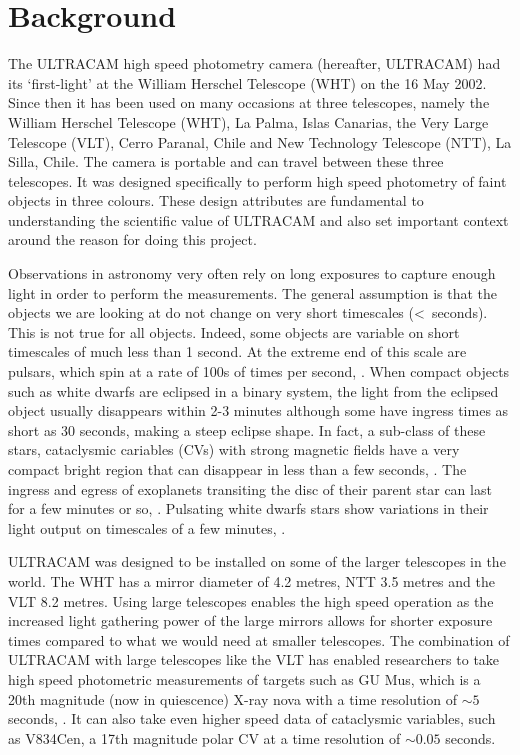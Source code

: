 \section{Background} 

The ULTRACAM high speed photometry camera (hereafter, ULTRACAM) had its `first-light' at the William Herschel Telescope (WHT) on the 16 May 2002. Since then it has been used on many occasions at three telescopes, namely the William Herschel Telescope (WHT), La Palma, Islas Canarias, the Very Large Telescope (VLT), Cerro Paranal, Chile and New Technology Telescope (NTT), La Silla, Chile. The camera is portable and can travel between these three telescopes. It was designed specifically to perform high speed photometry of faint objects in three colours. These design attributes are fundamental to understanding the scientific value of ULTRACAM and also set important context around the reason for doing this project.  

Observations in astronomy very often rely on long exposures to capture enough light in order to perform the measurements. The general assumption is that the objects we are looking at do not change on very short timescales (\textless~seconds). This is not true for all objects. Indeed, some objects are variable on short timescales of much less than 1 second. At the extreme end of this scale are pulsars, which spin at a rate of 100s of times per second, \citep{pulsarreview}. When compact objects such as white dwarfs are eclipsed in a binary system, the light from the eclipsed object usually disappears within 2-3 minutes although some have ingress times as short as 30 seconds, making a steep eclipse shape. In fact, a sub-class of these stars, cataclysmic cariables (CVs) with strong magnetic fields have a very compact bright region that can disappear in less than a few seconds, \citep{WarnerBook}. The ingress and egress of exoplanets transiting the disc of their parent star can last for a few minutes or so, \citep{exoplanettransits}. Pulsating white dwarfs stars show variations in their light output on timescales of a few minutes, \citep{wingetreview}. 

ULTRACAM was designed to be installed on some of the larger telescopes in the world. The WHT has a mirror diameter of 4.2 metres, NTT 3.5 metres and the VLT 8.2 metres. Using large telescopes enables the high speed operation as the increased light gathering power of the large mirrors allows for shorter exposure times compared to what we would need at smaller telescopes. The combination of ULTRACAM with large telescopes like the VLT has enabled researchers to take high speed photometric measurements of targets such as GU Mus, which is a 20th magnitude (now in quiescence) X-ray nova with a time resolution of $\sim 5$ seconds, \citep{tariq2010}. It can also take even higher speed data of cataclysmic variables, such as V834Cen, a 17th magnitude polar CV at a time resolution of $\sim 0.05$ seconds.

